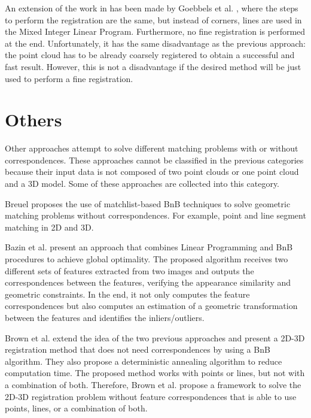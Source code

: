         An extension of the work in \cite{Goebbels_2018_alinear} has been made by Goebbels et al. \cite{Goebbels_2018_linebased}, 
        where the steps to perform the registration are the same, but instead of corners, lines are used in the Mixed Integer Linear Program. 
        Furthermore, no fine registration is performed at the end.
        Unfortunately, it has the same disadvantage as the previous approach: the point cloud has to be already coarsely registered to obtain a successful and fast result.
        However, this is not a disadvantage if the desired method will be just used to perform a fine registration.

    \section{Others} 

    Other approaches attempt to solve different matching problems with or without correspondences.
    These approaches cannot be classified in the previous categories because their input data is not composed of two point clouds or one point cloud and a 3D model.
    Some of these approaches are collected into this category.

    Breuel \cite{Breuel_2003_implementation} proposes the use of matchlist-based BnB techniques to solve geometric matching problems without correspondences.
    For example, point and line segment matching in 2D and 3D.

    Bazin et al. \cite{Bazin_2013_abranchandbound} present an approach that combines Linear Programming and BnB procedures to achieve global optimality.
    The proposed algorithm receives two different sets of features extracted from two images and outputs
    the correspondences between the features, verifying the appearance similarity and geometric constraints.
    In the end, it not only computes the feature correspondences but also computes an estimation of a geometric transformation between the features
    and identifies the inliers/outliers.

    Brown et al. \cite{Brown_2015_globally} extend the idea of the two previous approaches and present a 2D-3D registration method that does not need
    correspondences by using a BnB algorithm. They also propose a deterministic annealing algorithm to reduce computation time.
    The proposed method works with points or lines, but not with a combination of both.
    Therefore, Brown et al. \cite{Brown_2019_afamily} propose a framework to solve the 2D-3D registration problem without feature correspondences
    that is able to use points, lines, or a combination of both.

